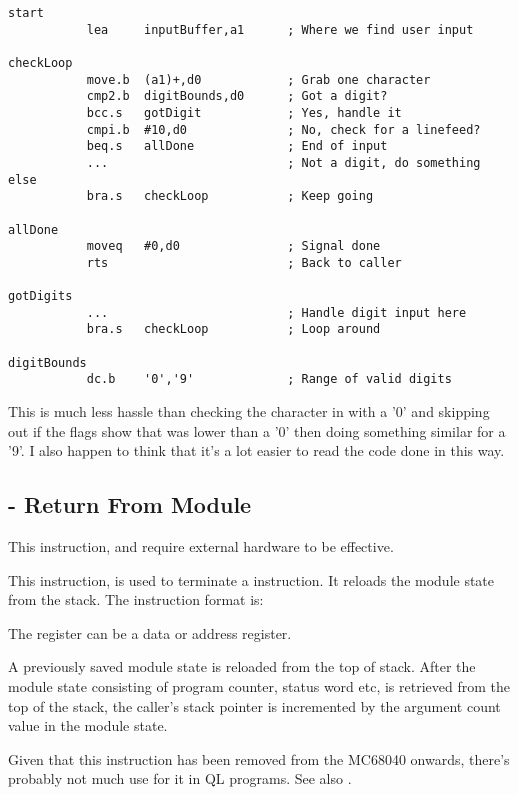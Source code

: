 \begin{lstlisting}[firstnumber=1,caption={Example of the \opcode{CMP2} Instruction}]
start
           lea     inputBuffer,a1      ; Where we find user input
           
checkLoop           
           move.b  (a1)+,d0            ; Grab one character
           cmp2.b  digitBounds,d0      ; Got a digit?
           bcc.s   gotDigit            ; Yes, handle it
           cmpi.b  #10,d0              ; No, check for a linefeed?
           beq.s   allDone             ; End of input
           ...                         ; Not a digit, do something else
           bra.s   checkLoop           ; Keep going
           
allDone
           moveq   #0,d0               ; Signal done
           rts                         ; Back to caller           
           
gotDigits
           ...                         ; Handle digit input here
           bra.s   checkLoop           ; Loop around

digitBounds
           dc.b    '0','9'             ; Range of valid digits           
\end{lstlisting}

This is much less hassle than checking the character in  with a '0' and skipping out if the flags show that  was lower than a '0' then doing something similar for a '9'. I also happen to think that it's a lot easier to read the code done in this way.

\subsection{ - Return From Module}

This instruction, and  require external hardware to be effective. 

This instruction, is used to terminate a  instruction. It reloads the module state from the stack. The instruction format is:


The register can be a data or address register.

A previously saved module state is reloaded from the top of stack. After the module state consisting of program counter, status word etc, is retrieved from the top of the stack, the caller’s stack pointer is incremented by the argument count value in the module state.

Given that this instruction has been removed from the MC68040 onwards, there's probably not much use for it in QL programs. See also .

